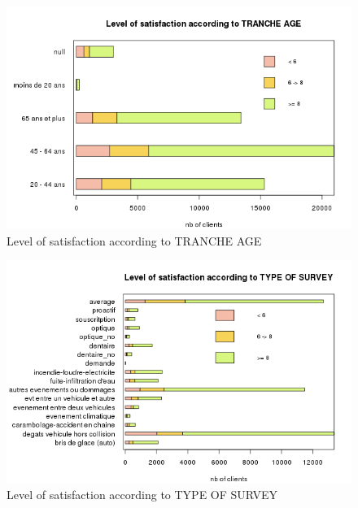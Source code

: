 \documentclass[a4paper, 11pt]{article}
\begin{document}
        \begin{figure}[!ht]
        	\centering
                \includegraphics[height = 10 cm]{Remi/Level_of_satisfaction_according_to_TRANCHE_AGE.png}
                \caption{Level of satisfaction according to TRANCHE AGE}
                \label{fig:TRANCHE_AGE}
        \end{figure}
        
        \begin{figure}[!ht]
        	\centering
                \includegraphics[height = 10 cm]{Remi/Level_of_satisfaction_according_to_TYPE_OF_SURVEY.png}
                \caption{Level of satisfaction according to TYPE OF SURVEY}
                \label{fig:TYPE_OF_SURVEY}
        \end{figure}
        
\end{document}
